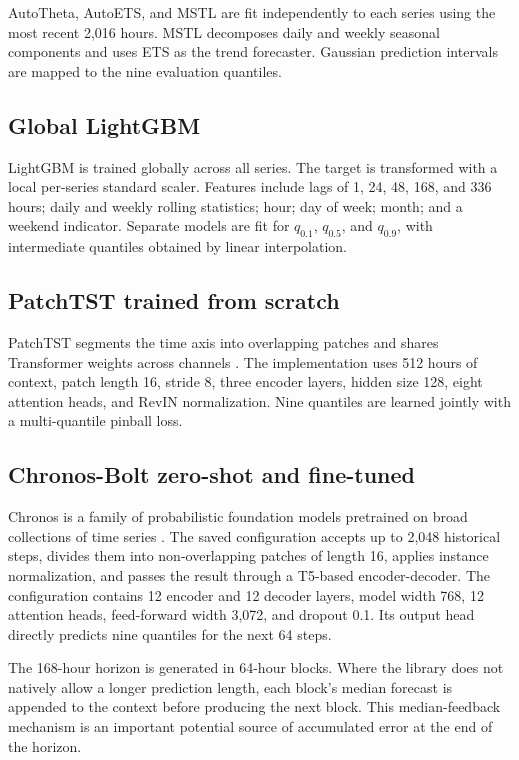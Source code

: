 \documentclass[11pt,a4paper]{article}
\newcommand{\code}[1]{\texttt{\detokenize{#1}}}
\begin{document}
AutoTheta, AutoETS, and MSTL are fit independently to each series using the most recent 2,016 hours.
MSTL decomposes daily and weekly seasonal components and uses ETS as the trend forecaster. Gaussian
prediction intervals are mapped to the nine evaluation quantiles.

\subsection{Global LightGBM}

LightGBM \cite{ke2017} is trained globally across all series. The target is transformed with a
local per-series standard scaler. Features include lags of 1, 24, 48, 168, and 336 hours; daily and
weekly rolling statistics; hour; day of week; month; and a weekend indicator. Separate models are
fit for $q_{0.1}$, $q_{0.5}$, and $q_{0.9}$, with intermediate quantiles obtained by linear
interpolation.

\subsection{PatchTST trained from scratch}

PatchTST segments the time axis into overlapping patches and shares Transformer weights across
channels \cite{nie2023}. The implementation uses 512 hours of context, patch length 16, stride 8,
three encoder layers, hidden size 128, eight attention heads, and RevIN normalization. Nine
quantiles are learned jointly with a multi-quantile pinball loss.

\subsection{Chronos-Bolt zero-shot and fine-tuned}

Chronos is a family of probabilistic foundation models pretrained on broad collections of time
series \cite{ansari2024}. The saved \code{chronos-bolt-base} configuration accepts up to 2,048
historical steps, divides them into non-overlapping patches of length 16, applies instance
normalization, and passes the result through a T5-based encoder-decoder. The configuration contains
12 encoder and 12 decoder layers, model width 768, 12 attention heads, feed-forward width 3,072,
and dropout 0.1. Its output head directly predicts nine quantiles for the next 64 steps.

The 168-hour horizon is generated in 64-hour blocks. Where the library does not natively allow a
longer prediction length, each block's median forecast is appended to the context before producing
the next block. This median-feedback mechanism is an important potential source of accumulated
error at the end of the horizon.
\end{document}
